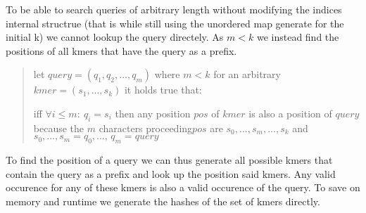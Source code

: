 To be able to search queries of arbitrary length without modifying the indices internal structrue (that is while still
using the unordered map generate for the initial k) we cannot lookup the query directely. As $m < k$ we instead
find the positions of all kmers that have the query as a prefix.

\begin{verse}
let $query=(q_{1},q_{2},...,q_{m})$ where $m<k$
for an arbitrary $kmer=(s_{1},...,s_{k})$ it holds true that:

iff $\forall i\leq m:\:q_{i}=s_{i}$ then any position $pos$ of $kmer$
is also a position of $query$
because the $m$ characters proceeding$pos$ are
$s_{0},...,s_{m},...,s_{k}$ and $s_{0},...,s_{m}=q_{0},...,\,q_{m}=query$
\end{verse}

To find the position of a query we can thus generate all possible kmers that contain the query as a prefix and
look up the position said kmers. Any valid occurence for any of these kmers is also a valid occurence of the query.
To save on memory and runtime we generate the hashes of the set of kmers directly.

